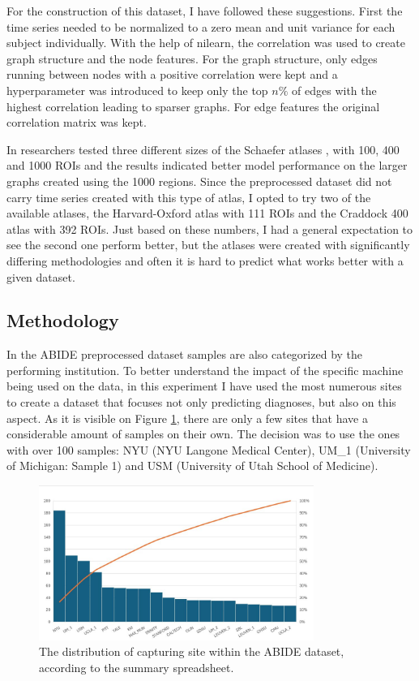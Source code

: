 	For the construction of this dataset, I have followed these suggestions. First the time series needed to be normalized to a zero mean and unit variance for each subject individually. With the help of nilearn, the correlation was used to create graph structure and the node features. For the graph structure, only edges running between nodes with a positive correlation were kept and a hyperparameter was introduced to keep only the top $n\%$ of edges with the highest correlation leading to sparser graphs. For edge features the original correlation matrix was kept.
	
	In \cite{said2023neurograph} researchers tested three different sizes of the Schaefer atlases \cite{schaefer2018local}, with 100, 400 and 1000 ROIs and the results indicated better model performance on the larger graphs created using the 1000 regions. Since the preprocessed dataset did not carry time series created with this type of atlas, I opted to try two of the available atlases, the Harvard-Oxford atlas \cite{desikan2006automated} with 111 ROIs and the Craddock 400 atlas \cite{craddock2012whole} with 392 ROIs. Just based on these numbers, I had a general expectation to see the second one perform better, but the atlases were created with significantly differing methodologies and often it is hard to predict what works better with a given dataset.
	
	\subsection{Methodology}
	
	In the ABIDE preprocessed dataset samples are also categorized by the performing institution. To better understand the impact of the specific machine being used on the data, in this experiment I have used the most numerous sites to create a dataset that focuses not only predicting diagnoses, but also on this aspect. As it is visible on Figure \ref{fig:distribution}, there are only a few sites that have a considerable amount of samples on their own. The decision was to use the ones with over 100 samples: NYU (NYU Langone Medical Center), UM\_1 (University of Michigan: Sample 1) and USM (University of Utah School of Medicine).
	
	\begin{figure}[!h]
		\centering
		\includegraphics[width=0.8\textwidth]{figures/ABIDE-sites.jpg}
		\caption{The distribution of capturing site within the ABIDE dataset, according to the summary spreadsheet.}
		\label{fig:distribution}
	\end{figure}
	

